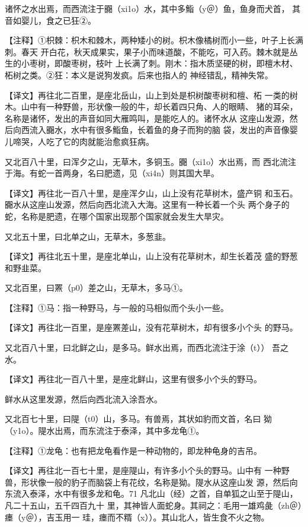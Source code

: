 \documentclass[a4paper,12pt,UTF8,twoside]{ctexbook}
\begin{document}
诸怀之水出焉，而西流注于嚻（xi1o）水，其中多鮨（y＠）鱼，鱼身而犬首， 其音如婴儿，食之已狂②。

【注释】①枳棘：枳木和棘木，两种矮小的树。枳木像橘树而小一些，叶子上长满刺。春天 开白花，秋天成果实，果子小而味道酸，不能吃，可入药。棘木就是丛生的小枣树，即酸枣树，枝叶 上长满了刺。刚木：指木质坚硬的树，即檀木材、柘树之类。②狂：本义是说狗发疯。后来也指人的 神经错乱，精神失常。

【译文】再往北二百里，是座北岳山，山上到处是枳树酸枣树和檀、柘 一类的树木。山中有一种野兽，形状像一般的牛，却长着四只角、人的眼睛、 猪的耳朵，名称是诸怀，发出的声音如同大雁鸣叫，是能吃人的。诸怀水从 这座山发源，然后向西流入嚻水，水中有很多鮨鱼，长着鱼的身子而狗的脑 袋，发出的声音像婴儿啼哭，人吃了它的肉就能治愈疯狂病。

又北百八十里，曰浑夕之山，无草木，多铜玉。嚻（xi1o）水出焉，而 西北流注于海。有蛇一首两身，名曰肥遗，见（xi4n）则其国大旱。

【译文】再往北一百八十里，是座浑夕山，山上没有花草树木，盛产铜 和玉石。嚻水从这座山发源，然后向西北流入大海。这里有一种长着一个头 两个身子的蛇，名称是肥遗，在哪个国家出现那个国家就会发生大旱灾。

又北五十里，曰北单之山，无草木，多葱韭。

【译文】再往北五十里，是座北单山，山上没有花草树木，却生长着茂 盛的野葱和野韭菜。

又北百里，曰罴（p0）差之山，无草木，多马①。

【注释】①马：指一种野马，与一般的马相似而个头小一些。

【译文】再往北一百里，是座罴差山，没有花草树木，却有很多小个头 的野马。

又北百八十里，曰北鲜之山，是多马。鲜水出焉，而西北流注于涂（t）） 吾之水。

【译文】再往北一百八十里，是座北鲜山，这里有很多小个头的野马。

鲜水从这里发源，然后向西北流入涂吾水。

又北百七十里，曰隄（t0）山，多马。有兽焉，其状如豹而文首，名曰 狕（y1o）。隄水出焉，而东流注于泰泽，其中多龙龟①。

【注释】①龙龟：也有把龙龟看作是一种动物的，即龙种龟身的吉吊。

【译文】再往北一百七十里，是座隄山，有许多小个头的野马。山中有 一种野兽，形状像一般的豹子而脑袋上有花纹，名称是狕。隄水从这座山发 源，然后向东流入泰泽，水中有很多龙和龟。71 凡北山（经）之首，自单狐之山至于隄山，凡二十五山，五千四百九十 里，其神皆人面蛇身。其祠之：毛用一雄鸡彘（zh＠）瘗（y＠），吉玉用一 珪，瘗而不糈（x））。其山北人，皆生食不火之物。
\end{document}
